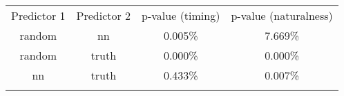 \begin{tabular}{cccc}
\hline\noalign{\smallskip}
Predictor 1 & Predictor 2 & p-value (timing) & p-value (naturalness) \\
\noalign{\smallskip}\svhline\noalign{\smallskip}
random & nn & 0.005\% & 7.669\% \\
random & truth & 0.000\% & 0.000\% \\
nn & truth & 0.433\% & 0.007\% \\
\noalign{\smallskip}\hline\noalign{\smallskip}
\end{tabular}
